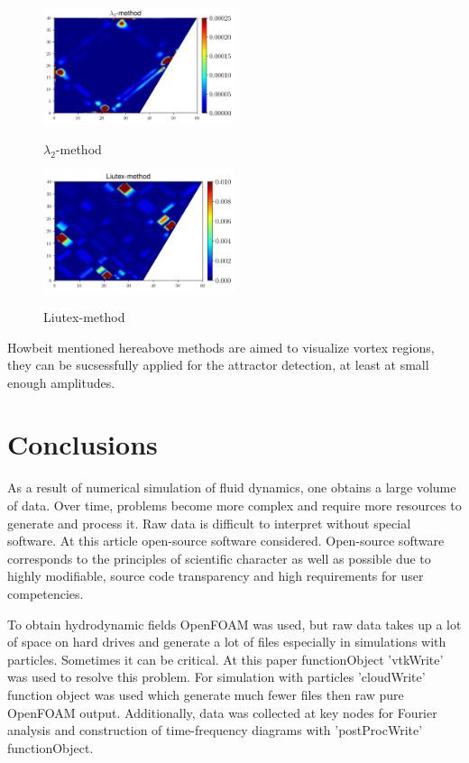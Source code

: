 \documentclass[a4wide,fontsize=12pt]{article}
\begin{document}
\begin{figure}
\begin{multicols}{2}
    \centering
    \includegraphics[width=0.5\textwidth]{Figs/VortexLambda2.png}
    \caption{$\lambda_2$-method}
    \label{fig:L2}
    \hfill
    \includegraphics[width=0.5\textwidth]{Figs/VortexLui.png}
    \caption{Liutex-method}
    \label{fig:Liu}
    \end{multicols}
\end{figure}

Howbeit mentioned hereabove methods are aimed to visualize vortex regions, they can be sucsessfully applied for the attractor detection, at least at small enough amplitudes.

\section{Conclusions}

As a result of numerical simulation of fluid dynamics, one obtains a large volume of data. Over time, problems become more complex and require more resources to generate and process it. Raw data is difficult to interpret without special software. At this article open-source software considered. Open-source software corresponds to the principles of scientific character as well as possible due to highly modifiable, source code transparency and high requirements for user competencies.

To obtain hydrodynamic fields OpenFOAM was used, but raw data takes up a lot of space on hard drives and generate a lot of files especially in simulations with particles. Sometimes it can be critical. At this paper functionObject 'vtkWrite' was used to resolve this problem. For simulation with particles 'cloudWrite' function object was used which generate much fewer files then raw pure OpenFOAM output. Additionally, data was collected at key nodes for Fourier analysis and construction of time-frequency diagrams with 'postProcWrite' functionObject.
\end{document}
